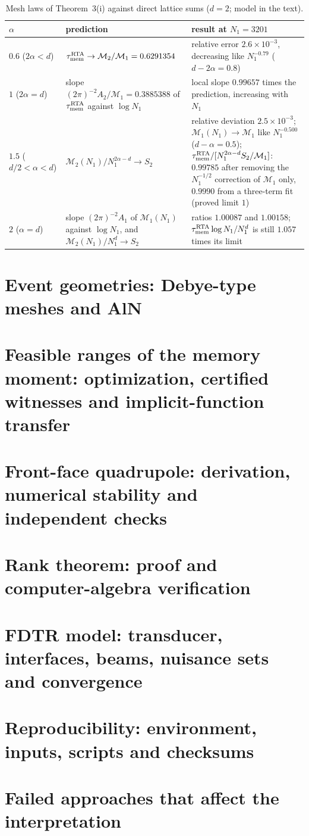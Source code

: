 \documentclass[aps,prb,10pt,onecolumn,amsmath,amssymb,superscriptaddress,nofootinbib]{revtex4-2}
\theoremstyle{plain}
\newcommand{\tmem}{\tau_{\rm mem}}
\begin{document}
\begin{table}[htbp]
\caption{Mesh laws of Theorem~3(i) against direct lattice sums ($d=2$; model in the text).}
\label{tab:ir}
\begin{ruledtabular}
\begin{tabular}{l p{} p{}}
$\alpha$ & prediction & result at $N_1=3201$\\ \hline
$0.6$ ($2\alpha<d$) & $\tmem^{\rm RTA}\to\mathcal M_2/\mathcal M_1=0.6291354$
& relative error $2.6\times10^{-3}$, decreasing like $N_1^{-0.79}$ (\mbox{$d-2\alpha=0.8$})\\
$1$ ($2\alpha=d$) & slope $(2\pi)^{-2}A_2/\mathcal M_1=0.3885388$ of $\tmem^{\rm RTA}$ against $\log N_1$
& local slope $0.99657$ times the prediction, increasing with $N_1$\\
$1.5$ ($d/2<\alpha<d$) & $\mathcal M_2(N_1)/N_1^{2\alpha-d}\to S_2$
& relative deviation $2.5\times10^{-3}$; $\mathcal M_1(N_1)\to\mathcal M_1$ like $N_1^{-0.500}$
(\mbox{$d-\alpha=0.5$}); $\tmem^{\rm RTA}/[N_1^{2\alpha-d}S_2/\mathcal M_1]$: $0.99785$ after removing the $N_1^{-1/2}$ correction of
$\mathcal M_1$ only, $0.9990$ from a three-term fit (proved limit $1$)\\
$2$ ($\alpha=d$) & slope $(2\pi)^{-2}A_1$ of $\mathcal M_1(N_1)$ against $\log N_1$, and
$\mathcal M_2(N_1)/N_1^d\to S_2$
& ratios $1.00087$ and $1.00158$; $\tmem^{\rm RTA}\log N_1/N_1^d$ is still $1.057$ times its limit\\
\end{tabular}
\end{ruledtabular}
\end{table}

\section{Event geometries: Debye-type meshes and AlN}
\section{Feasible ranges of the memory moment: optimization, certified witnesses and implicit-function transfer}
\section{Front-face quadrupole: derivation, numerical stability and independent checks}
\section{Rank theorem: proof and computer-algebra verification}
\section{FDTR model: transducer, interfaces, beams, nuisance sets and convergence}
\section{Reproducibility: environment, inputs, scripts and checksums}
\section{Failed approaches that affect the interpretation}
\end{document}
